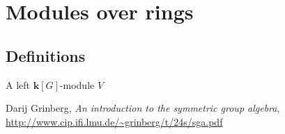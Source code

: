 \documentclass{article}
\begin{document}
\section{Modules over rings}
\subsection{Definitions}
\begin{definition}

\end{definition}

\begin{theorem}
    A left $\mathbf{k}[G]$-module $V$
\end{theorem}




\begin{thebibliography}{999999}
    \raggedright\footnotesize

    Darij Grinberg, \textit{An introduction to the symmetric group algebra}, \url{http://www.cip.ifi.lmu.de/~grinberg/t/24s/sga.pdf}

\end{thebibliography}
\end{document}
